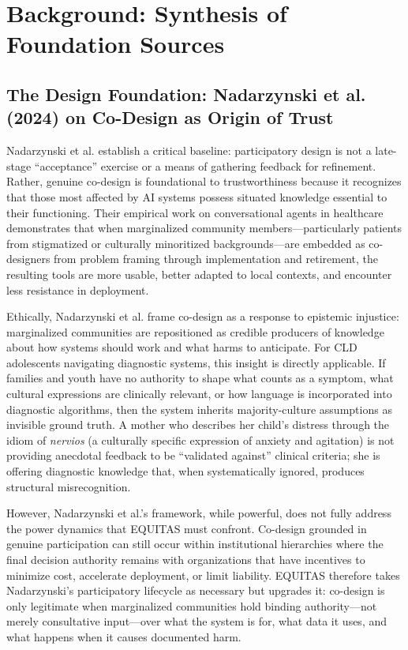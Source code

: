 \documentclass[12pt,letterpaper]{article}
\begin{document}
\section{Background: Synthesis of Foundation Sources}

\subsection{The Design Foundation: Nadarzynski et al. (2024) on Co-Design as Origin of Trust}

Nadarzynski et al. establish a critical baseline: participatory design is not a late-stage ``acceptance'' exercise or a means of gathering feedback for refinement. Rather, genuine co-design is foundational to trustworthiness because it recognizes that those most affected by AI systems possess situated knowledge essential to their functioning.\cite{nadarzynski2024} Their empirical work on conversational agents in healthcare demonstrates that when marginalized community members---particularly patients from stigmatized or culturally minoritized backgrounds---are embedded as co-designers from problem framing through implementation and retirement, the resulting tools are more usable, better adapted to local contexts, and encounter less resistance in deployment.\cite{nadarzynski2024}

Ethically, Nadarzynski et al. frame co-design as a response to epistemic injustice: marginalized communities are repositioned as credible producers of knowledge about how systems should work and what harms to anticipate. For CLD adolescents navigating diagnostic systems, this insight is directly applicable. If families and youth have no authority to shape what counts as a symptom, what cultural expressions are clinically relevant, or how language is incorporated into diagnostic algorithms, then the system inherits majority-culture assumptions as invisible ground truth.\cite{nadarzynski2024} A mother who describes her child's distress through the idiom of \textit{nervios} (a culturally specific expression of anxiety and agitation) is not providing anecdotal feedback to be ``validated against'' clinical criteria; she is offering diagnostic knowledge that, when systematically ignored, produces structural misrecognition.

However, Nadarzynski et al.'s framework, while powerful, does not fully address the power dynamics that EQUITAS must confront. Co-design grounded in genuine participation can still occur within institutional hierarchies where the final decision authority remains with organizations that have incentives to minimize cost, accelerate deployment, or limit liability. EQUITAS therefore takes Nadarzynski's participatory lifecycle as necessary but upgrades it: co-design is only legitimate when marginalized communities hold binding authority---not merely consultative input---over what the system is for, what data it uses, and what happens when it causes documented harm.
\end{document}
